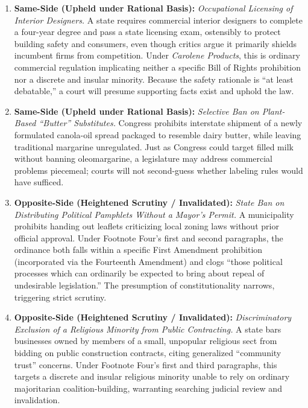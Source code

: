 \documentclass[12pt]{article}
\begin{document}
\begin{enumerate}
    \item \textbf{Same-Side (Upheld under Rational Basis):} \textit{Occupational Licensing of Interior Designers.} A state requires commercial interior designers to complete a four-year degree and pass a state licensing exam, ostensibly to protect building safety and consumers, even though critics argue it primarily shields incumbent firms from competition. Under \textit{Carolene Products}, this is ordinary commercial regulation implicating neither a specific Bill of Rights prohibition nor a discrete and insular minority. Because the safety rationale is ``at least debatable,'' a court will presume supporting facts exist and uphold the law.
    \item \textbf{Same-Side (Upheld under Rational Basis):} \textit{Selective Ban on Plant-Based ``Butter'' Substitutes.} Congress prohibits interstate shipment of a newly formulated canola-oil spread packaged to resemble dairy butter, while leaving traditional margarine unregulated. Just as Congress could target filled milk without banning oleomargarine, a legislature may address commercial problems piecemeal; courts will not second-guess whether labeling rules would have sufficed.
    \item \textbf{Opposite-Side (Heightened Scrutiny / Invalidated):} \textit{State Ban on Distributing Political Pamphlets Without a Mayor's Permit.} A municipality prohibits handing out leaflets criticizing local zoning laws without prior official approval. Under Footnote Four's first and second paragraphs, the ordinance both falls within a specific First Amendment prohibition (incorporated via the Fourteenth Amendment) and clogs ``those political processes which can ordinarily be expected to bring about repeal of undesirable legislation.'' The presumption of constitutionality narrows, triggering strict scrutiny.
    \item \textbf{Opposite-Side (Heightened Scrutiny / Invalidated):} \textit{Discriminatory Exclusion of a Religious Minority from Public Contracting.} A state bars businesses owned by members of a small, unpopular religious sect from bidding on public construction contracts, citing generalized ``community trust'' concerns. Under Footnote Four's first and third paragraphs, this targets a discrete and insular religious minority unable to rely on ordinary majoritarian coalition-building, warranting searching judicial review and invalidation.

\end{enumerate}
\end{document}
